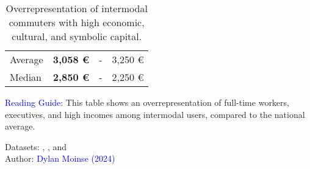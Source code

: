 \begin{table}[h!]
{\begin{tabular}{p{}p{}p{}p{}}
\small{Average} & \textbf{\small{3,058 \euro}} & \small{-} & \small{3,250 \euro}\\
\small{Median} & \textbf{\small{2,850 \euro}} & \small{-} & \small{2,250 \euro}\\
        \hline
        \end{tabular}}
    \caption{Overrepresentation of intermodal commuters with high economic, cultural, and symbolic capital.}
    \label{table-chap4:capital-economique}
        \vspace{5pt}
        \begin{flushleft}\scriptsize
        \textcolor{blue}{Reading Guide:} This table shows an overrepresentation of full-time workers, executives, and high incomes among intermodal users, compared to the national average.
        \end{flushleft}
        \begin{flushright}\scriptsize{
        Datasets: \textcolor{blue}{\textcite{sncf_repartition_2017}}, \textcolor{blue}{\textcite{insee_categorie_2024}}, \textcolor{blue}{\textcite{insee_evolution_2023}} and \textcolor{blue}{\textcite{insee_niveau_2024}}
        \\
        Author: \textcolor{blue}{Dylan Moinse (2024)}
        }\end{flushright}
        \end{table}